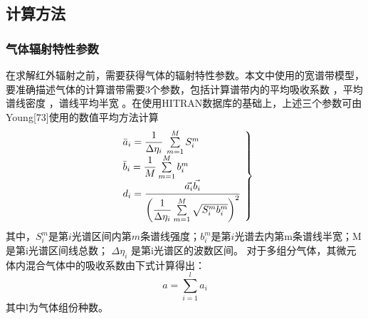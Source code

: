 \subsection{计算方法}
\subsubsection{气体辐射特性参数}
在求解红外辐射之前，需要获得气体的辐射特性参数。本文中使用的宽谱带模型，要准确描述气体的计算谱带需要3个参数，包括计算谱带内的平均吸收系数 ，平均谱线密度 ，谱线平均半宽 。在使用HITRAN数据库的基础上，上述三个参数可由Young[73]使用的数值平均方法计算
\begin{equation}
\left. \begin{array}{l}
{{\bar a}_i} = \dfrac{1}{{\Delta {\eta _i}}}\,\sum\limits_{m = 1}^M {S_i^m} \\
{{\bar b}_i} = \dfrac{1}{M}\sum\limits_{m = 1}^M {b_i^m} \\
d_i=\cfrac{\vec{a_i} \vec{b_i}}{\left(\dfrac{1}{\Delta\eta_i} \sum\limits_{m=1}^M \sqrt{S_i^m b_i^m}\right)^2}
\end{array} \right\}
\end{equation}
其中，$S_i^m$是第$i$光谱区间内第$m$条谱线强度；$b_i^m$是第$i$光谱去内第m条谱线半宽；M是第i光谱区间线总数； $\Delta {\eta _i}$ 是第i光谱区的波数区间。
对于多组分气体，其微元体内混合气体中的吸收系数由下式计算得出：
\begin{equation}
a = \sum\limits_{i = 1}^l {{a_i}} 
\end{equation}
其中l为气体组份种数。
